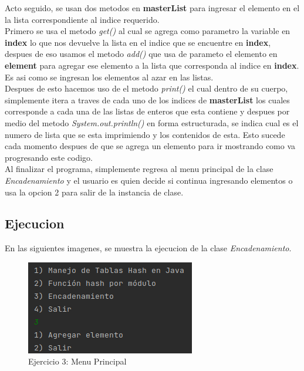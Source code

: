 \documentclass{article}
\begin{document}
			Acto seguido, se usan dos metodos en \textbf{masterList} para ingresar el elemento en el la lista correspondiente al indice requerido.\\
			
			Primero se usa el metodo \emph{get()} al cual se agrega como parametro la variable en \textbf{index} lo que nos devuelve la lista en el indice que se encuentre en \textbf{index}, despues de eso usamos el metodo \emph{add()} que usa de parameto el elemento en \textbf{element} para agregar ese elemento a la lista que corresponda al indice en \textbf{index}.\\
			
			Es asi como se ingresan los elementos al azar en las listas.\\
			
			Despues de esto hacemos uso de el metodo \emph{print()} el cual dentro de su cuerpo, simplemente itera a traves de cada uno de los indices de \textbf{masterList} los cuales corresponde a cada una de las listas de enteros que esta contiene y despues por medio del metodo \emph{System.out.println()} en forma estructurada, se indica cual es el numero de lista que se esta imprimiendo y los contenidos de esta. Esto sucede cada momento despues de que se agrega un elemento para ir mostrando como va progresando este codigo.\\
			
			Al finalizar el programa, simplemente regresa al menu principal de la clase \emph{Encadenamiento} y el usuario es quien decide si continua ingresando elementos o usa la opcion 2 para salir de la instancia de clase.
		
		\subsection{Ejecucion}
		
		En las siguientes imagenes, se muestra la ejecucion de la clase \emph{Encadenamiento}.\\

			\begin{figure}[H]
				\centering
				\includegraphics{images/e31.png}
				\caption*{Ejercicio 3: Menu Principal}
			\end{figure}
			
\end{document}

